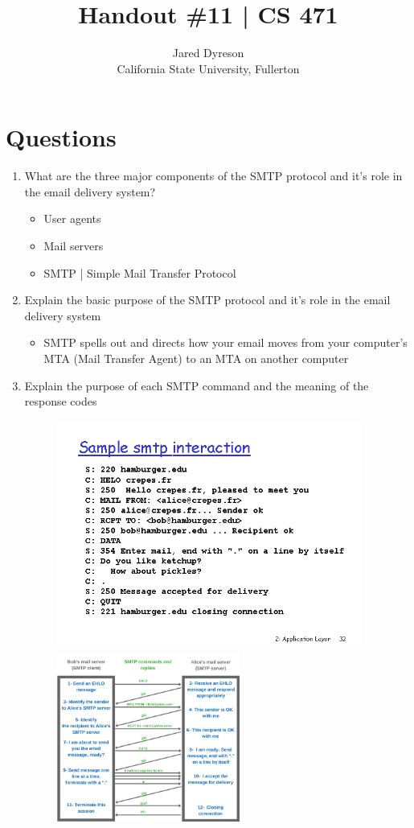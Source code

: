 \documentclass{article}
\title{Handout \#11 | CS 471}
\author{Jared Dyreson\\ 
        California State University, Fullerton}
\begin{document}
\maketitle
\tableofcontents

\newpage

\section{Questions}

\begin{enumerate}
\item What are the three major components of the SMTP protocol and it's role in the email delivery system?

\begin{itemize}
\item User agents
\item Mail servers
\item SMTP | Simple Mail Transfer Protocol
\end{itemize}

\item Explain the basic purpose of the SMTP protocol and it's role in the email delivery system

\begin{itemize}
\item SMTP spells out and directs how your email moves from your computer's MTA (Mail Transfer Agent) to an MTA on another computer
\end{itemize}

\item Explain the purpose of each SMTP command and the meaning of the response codes

\begin{figure}[!h]
\centering
\includegraphics[width=10cm]{SMTP_Commands}
\includegraphics[width=6cm]{SMTP-sequence-diagram}
\end{figure}


\end{enumerate}
\end{document}
